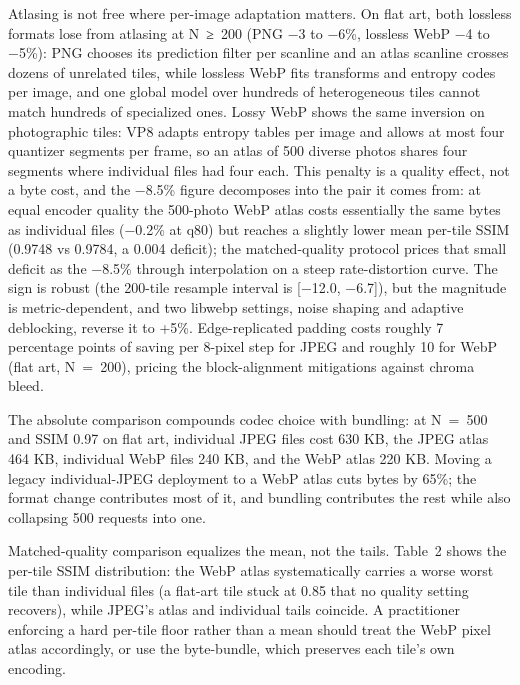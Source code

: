 \documentclass[3p,twocolumn]{elsarticle}
\begin{document}
Atlasing is not free where per-image adaptation matters. On flat art,
both lossless formats lose from atlasing at N~≥~200 (PNG −3 to −6\%,
lossless WebP −4 to −5\%): PNG chooses its prediction filter per
scanline and an atlas scanline crosses dozens of unrelated tiles, while
lossless WebP fits transforms and entropy codes per image, and one
global model over hundreds of heterogeneous tiles cannot match hundreds
of specialized ones. Lossy WebP shows the same inversion on photographic
tiles: VP8 adapts entropy tables per image and allows at most four
quantizer segments per frame, so an atlas of 500 diverse photos shares
four segments where individual files had four each. This penalty is a
quality effect, not a byte cost, and the −8.5\% figure decomposes into
the pair it comes from: at equal encoder quality the 500-photo WebP
atlas costs essentially the same bytes as individual files (−0.2\% at
q80) but reaches a slightly lower mean per-tile SSIM (0.9748 vs 0.9784,
a 0.004 deficit); the matched-quality protocol prices that small deficit
as the −8.5\% through interpolation on a steep rate-distortion curve.
The sign is robust (the 200-tile resample interval is [−12.0,
−6.7]), but the magnitude is metric-dependent, and two libwebp
settings, noise shaping and adaptive deblocking, reverse it to +5\%.
Edge-replicated padding costs roughly 7 percentage points of saving per
8-pixel step for JPEG and roughly 10 for WebP (flat art, N~=~200),
pricing the block-alignment mitigations against chroma bleed.

The absolute comparison compounds codec choice with bundling: at N~=~500
and SSIM 0.97 on flat art, individual JPEG files cost 630 KB, the JPEG
atlas 464 KB, individual WebP files 240 KB, and the WebP atlas 220 KB.
Moving a legacy individual-JPEG deployment to a WebP atlas cuts bytes by
65\%; the format change contributes most of it, and bundling contributes
the rest while also collapsing 500 requests into one.

Matched-quality comparison equalizes the mean, not the tails. Table~2
shows the per-tile SSIM distribution: the WebP atlas systematically
carries a worse worst tile than individual files (a flat-art tile stuck
at 0.85 that no quality setting recovers), while JPEG's
atlas and individual tails coincide. A practitioner enforcing a hard
per-tile floor rather than a mean should treat the WebP pixel atlas
accordingly, or use the byte-bundle, which preserves each
tile's own encoding.
\end{document}
